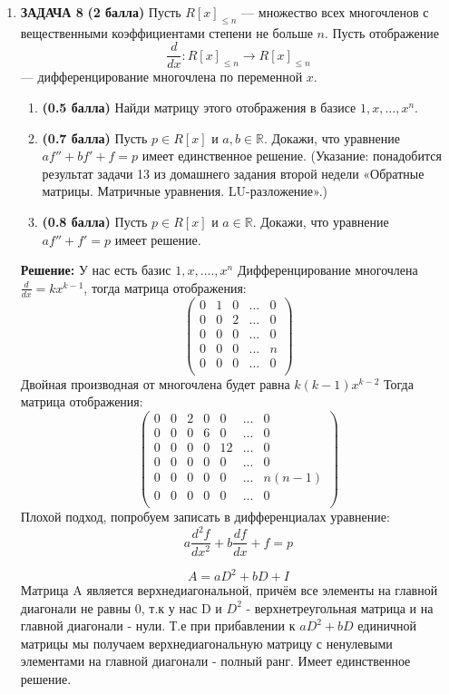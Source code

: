 \documentclass[a4paper,12pt]{article}
\begin{document}
\begin{enumerate}
    
    \item \textbf{ЗАДАЧА 8} \textbf{(2 балла)} Пусть $R[x]_{\leq n}$ — множество всех многочленов с вещественными коэффициентами степени не больше $n$. Пусть отображение
    \[
    \frac{d}{dx} : R[x]_{\leq n} \to R[x]_{\leq n}
    \]
    — дифференцирование многочлена по переменной $x$.
    \begin{enumerate}
        \item \textbf{(0.5 балла)} Найди матрицу этого отображения в базисе $1, x, \dots, x^n$.
        \item \textbf{(0.7 балла)} Пусть $p \in R[x]$ и $a, b \in \mathbb{R}$. Докажи, что уравнение $a f'' + b f' + f = p$ имеет единственное решение. (Указание: понадобится результат задачи 13 из домашнего задания второй недели «Обратные матрицы. Матричные уравнения. LU-разложение».)
        \item \textbf{(0.8 балла)} Пусть $p \in R[x]$ и $a \in \mathbb{R}$. Докажи, что уравнение $a f'' + f' = p$ имеет решение.
    \end{enumerate}
    \textbf{Решение: }
    У нас есть базис ${1, x, ...., x^n}$ Дифференцирование многочлена $\frac{d}{dx} = kx^{k-1}$, тогда матрица отображения: 
    \[
    \begin{pmatrix}
        0 & 1 & 0 &... & 0 \\
        0 & 0 & 2 &... & 0 \\
        0 & 0 & 0 &... & 0 \\
        0 & 0 & 0 &... & n \\
        0 & 0 & 0 &... & 0 \\
    \end{pmatrix}
    \]
    Двойная производная от многочлена будет равна $k(k-1)x^{k-2}$ Тогда матрица отображения: 
    \[
    \begin{pmatrix}
        0 & 0 & 2 & 0 & 0 & ... & 0 \\
        0 & 0 & 0 & 6 & 0 & ... & 0 \\
        0 & 0 & 0 & 0 & 12 & ... & 0 \\
        0 & 0 & 0 & 0 & 0 & ... & 0 \\
        0 & 0 & 0 & 0 & 0 & ... & n(n-1) \\
        0 & 0 & 0 & 0 & 0 & ... & 0 \\
    \end{pmatrix}
    \]
    Плохой подход, попробуем записать в дифференциалах уравнение: 
    \[
    a\frac{d^2f}{dx^2} + b\frac{df}{dx} + f = p
    \]

    \[
    A = aD^2+bD + I 
    \]
    Матрица A  является верхнедиагональной, причём все элементы на главной диагонали не равны 0, т.к у нас D и $D^2$ - верхнетреугольная матрица и на главной диагонали - нули. Т.е при прибавлении к $aD^2+bD$ единичной матрицы мы получаем верхнедиагональную матрицу с ненулевыми элементами на главной диагонали - полный ранг. Имеет единственное решение.



\end{enumerate}
\end{document}
